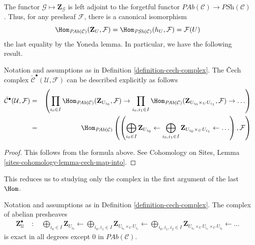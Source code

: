 \noindent
The functor $\mathcal{G} \mapsto \mathbf{Z}_\mathcal{G}$ is left adjoint to the
forgetful functor $\textit{PAb}(\mathcal{C}) \to \textit{PSh}(\mathcal{C})$.
Thus, for any presheaf $\mathcal{F}$, there is a canonical isomorphism
$$
\Hom_{\textit{PAb}(\mathcal{C})}(\mathbf{Z}_U, \mathcal{F})
=
\Hom_{\textit{PSh}(\mathcal{C})}(h_U, \mathcal{F})
=
\mathcal{F}(U)
$$
the last equality by the Yoneda lemma. In particular, we have the following
result.

\begin{lemma}
\label{lemma-cech-complex-describe}
Notation and assumptions as in Definition \ref{definition-cech-complex}.
The {\v C}ech complex $\check{\mathcal{C}}^\bullet(\mathcal{U}, \mathcal{F})$
can be described explicitly as follows
\begin{eqnarray*}
\check{\mathcal{C}}^\bullet(\mathcal{U}, \mathcal{F})
& = &
\left(
\prod_{i_0 \in I}
\Hom_{\textit{PAb}(\mathcal{C})}(\mathbf{Z}_{U_{i_0}}, \mathcal{F}) \to
\prod_{i_0, i_1 \in I}
\Hom_{\textit{PAb}(\mathcal{C})}(
\mathbf{Z}_{U_{i_0} \times_U U_{i_1}}, \mathcal{F}) \to \ldots
\right) \\
& = &
\Hom_{\textit{PAb}(\mathcal{C})}\left(
\left(
\bigoplus_{i_0 \in I} \mathbf{Z}_{U_{i_0}} \leftarrow
\bigoplus_{i_0, i_1 \in I} \mathbf{Z}_{U_{i_0} \times_U U_{i_1}} \leftarrow
\ldots
\right), \mathcal{F}\right)
\end{eqnarray*}
\end{lemma}

\begin{proof}
This follows from the formula above. See
Cohomology on Sites, Lemma \ref{sites-cohomology-lemma-cech-map-into}.
\end{proof}

\noindent
This reduces us to studying only the complex in the first argument of the
last $\Hom$.

\begin{lemma}
\label{lemma-exact}
Notation and assumptions as in Definition \ref{definition-cech-complex}.
The complex of abelian presheaves
\begin{align*}
\mathbf{Z}_\mathcal{U}^\bullet \quad : \quad
\bigoplus_{i_0 \in I} \mathbf{Z}_{U_{i_0}} \leftarrow
\bigoplus_{i_0, i_1 \in I} \mathbf{Z}_{U_{i_0} \times_U U_{i_1}} \leftarrow
\bigoplus_{i_0, i_1, i_2 \in I}
\mathbf{Z}_{U_{i_0} \times_U U_{i_1} \times_U U_{i_2}} \leftarrow
\ldots
\end{align*}
is exact in all degrees except $0$ in $\textit{PAb}(\mathcal{C})$.
\end{lemma}

